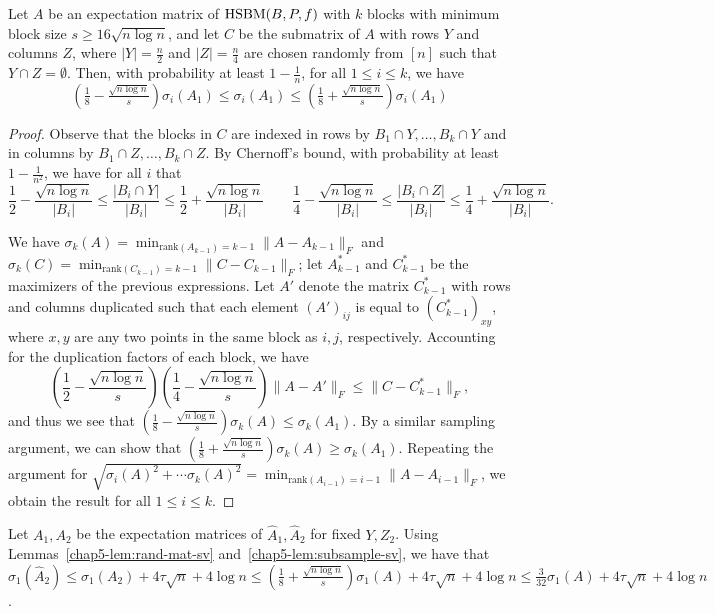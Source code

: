 \begin{lem}\label{chap5-lem:subsample-sv}
Let $A$ be an expectation matrix of $\textnormal{HSBM}(B,P,f)$ with $k$ blocks with minimum block size $s \geq 16\sqrt{n \log n}$, and let $C$ be the submatrix of $A$ with rows $Y$ and columns $Z$, where $|Y| = \frac{n}{2}$ and $|Z| = \frac{n}{4}$ are chosen randomly from $[n]$ such that $Y \cap Z = \emptyset$. Then, with probability at least $1-\frac{1}{n}$, for all $1 \leq i \leq k$, we have
\[
(\tfrac 1 8 - \tfrac{\sqrt{n \log n}} s)\sigma_i(A_1) \leq \sigma_i(A_1) \leq (\tfrac 1 8 + \tfrac{\sqrt{n \log n}} s)\sigma_i(A_1)
\]
\end{lem}
\begin{proof}
Observe that the blocks in $C$ are indexed in rows by $B_1 \cap Y, \ldots, B_k \cap Y$ and in columns by $B_1 \cap Z, \ldots, B_k \cap Z$. By Chernoff's bound, with probability at least $1 - \frac{1}{n^2}$, we have for all $i$ that
\[
    \frac{1}{2} - \frac{\sqrt{n \log n}}{|B_i|} \leq \frac{|B_i \cap Y|}{|B_i|} \leq \frac{1}{2} + \frac{\sqrt{n \log n}}{|B_i|} \ \ \ \ \ \ \ \ \ \frac 1 4 - \frac{\sqrt{n \log n}}{|B_i|} \leq \frac{|B_i \cap Z|}{|B_i|} \leq \frac 1 4 + \frac{\sqrt{n \log n}}{|B_i|}.
\]

We have $\sigma_{k}(A) = \min_{\text{rank}(A_{k-1}) = k-1} \|A - A_{k-1}\|_F$ and $\sigma_{k}(C) = \min_{\text{rank}(C_{k-1}) = k-1} \|C-C_{k-1}\|_F$; let $A_{k-1}^*$ and $C_{k-1}^*$ be the maximizers of the previous expressions. Let $A'$ denote the matrix $C_{k-1}^*$ with rows and columns duplicated such that each element $(A')_{ij}$ is equal to $(C_{k-1}^*)_{xy}$, where $x,y$ are any two points in the same block as $i,j$, respectively. Accounting for the duplication factors of each block, we have
\[
    \left(\frac 1 2 - \frac{\sqrt{n \log n}}{s}\right)\left(\frac 1 4 - \frac{\sqrt{n \log n}}{s}\right)\|A - A'\|_F \leq  \|C - C_{k-1}^*\|_F,
\]
and thus we see that $(\frac 1 8 - \frac{\sqrt{n \log n}}{s})\sigma_k(A) \leq \sigma_k(A_1)$. By a similar sampling argument, we can show that $(\frac 1 8 + \frac{\sqrt{n \log n}}{s})\sigma_k(A) \geq \sigma_k(A_1)$. Repeating the argument for $\sqrt{\sigma_{i}(A)^2 + \cdots \sigma_{k}(A)^2} = \min_{\text{rank}(A_{i-1})=i-1}\|A - A_{i-1}\|_F$, we obtain the result for all $1 \leq i \leq k$.
\end{proof}
Let $A_1, A_2$ be the expectation matrices of $\hat{A}_1, \hat{A}_2$ for fixed $Y,Z_2$. Using Lemmas~\ref{chap5-lem:rand-mat-sv} and~\ref{chap5-lem:subsample-sv}, we have that $\sigma_{1}(\hat{A}_2) \leq \sigma_1(A_2) + 4\tau \sqrt{n} + 4 \log n \leq (\frac{1}{8} + \frac{\sqrt{n \log n}}{s})\sigma_1(A) + 4\tau \sqrt{n} + 4 \log n \leq \frac{3}{32} \sigma_1(A) + 4\tau \sqrt{n} + 4 \log n$.
